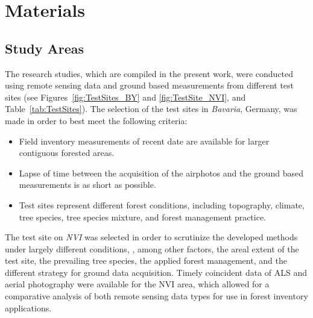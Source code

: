 \chapter{Materials}
\label{chp:Mat}


\section{Study Areas}\label{sec:StudyAreas}

The research studies, which are compiled in the present work, were conducted using remote sensing data and ground based measurements
from different test sites 
(see Figures~\ref{fig:TestSites_BY} and \ref{fig:TestSite_NVI}, and Table~\ref{tab:TestSites}).
The selection  of the test sites in \emph{Bavaria}, 
Germany, was made in order to best meet the following criteria:

\begin{itemize}
	\item Field inventory measurements of recent date are available for larger contiguous forested areas.
	\item Lapse of time between the acquisition of the airphotos and the ground based measurements is as short as possible.
	\item Test sites represent different forest conditions, including topography, climate, tree species, tree species mixture, 
		and forest management practice.
\end{itemize}

\noindent The test site on \emph{\ac{NVI}} was selected 
in order to scrutinize the developed methods 
under largely different conditions, \ie, among other factors, the areal extent of the test site, the prevailing tree species, the applied forest management, 
and the different strategy for ground data acquisition. Timely coincident data of \ac{ALS} and aerial photography were available for the \ac{NVI} area,
which allowed for a comparative analysis of both remote sensing data types for use in forest inventory applications.   

